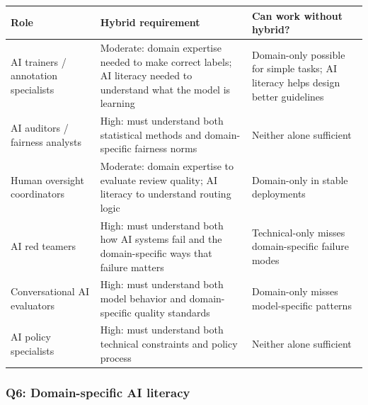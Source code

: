 \begin{center}
\begin{tabular}{p{3.5cm}p{3.5cm}p{3cm}}
\toprule
\textbf{Role} & \textbf{Hybrid requirement} & \textbf{Can work without hybrid?} \\
\midrule
AI trainers / annotation specialists & Moderate: domain expertise needed to make correct labels; AI literacy needed to understand what the model is learning & Domain-only possible for simple tasks; AI literacy helps design better guidelines \\
\addlinespace
AI auditors / fairness analysts & High: must understand both statistical methods and domain-specific fairness norms & Neither alone sufficient \\
\addlinespace
Human oversight coordinators & Moderate: domain expertise to evaluate review quality; AI literacy to understand routing logic & Domain-only in stable deployments \\
\addlinespace
AI red teamers & High: must understand both how AI systems fail and the domain-specific ways that failure matters & Technical-only misses domain-specific failure modes \\
\addlinespace
Conversational AI evaluators & High: must understand both model behavior and domain-specific quality standards & Domain-only misses model-specific patterns \\
\addlinespace
AI policy specialists & High: must understand both technical constraints and policy process & Neither alone sufficient \\
\bottomrule
\end{tabular}
\end{center}

\subsubsection*{Q6: Domain-specific AI literacy}

